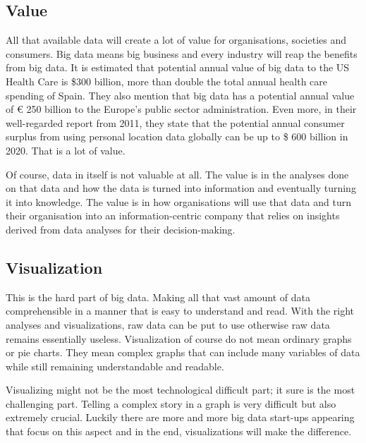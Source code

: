 \subsection{Value}
All that available data will create a lot of value for organisations, societies and consumers. Big data means big business and every industry will reap the benefits from big data. It is estimated that potential annual value of big data to the US Health Care is \$300 billion, more than double the total annual health care spending of Spain. They also mention that big data has a potential annual value of € 250 billion to the Europe’s public sector administration. Even more, in their well-regarded report from 2011, they state that the potential annual consumer surplus from using personal location data globally can be up to \$ 600 billion in 2020. That is a lot of value.
\par
Of course, data in itself is not valuable at all. The value is in the analyses done on that data and how the data is turned into information and eventually turning it into knowledge. The value is in how organisations will use that data and turn their organisation into an information-centric company that relies  on insights derived from data analyses for their decision-making.
\subsection{Visualization}
This is the hard part of big data. Making all that vast amount of data comprehensible in a manner that is easy to understand and read. With the right analyses and visualizations, raw data can be put to use otherwise raw data remains essentially useless. Visualization of course do not mean ordinary graphs or pie charts. They mean complex graphs that can include many variables of data while still remaining understandable and readable.
\par
Visualizing might not be the most technological difficult part; it sure is the most challenging part. Telling a complex story in a graph is very difficult but also extremely crucial. Luckily there are more and more big data start-ups appearing that focus on this aspect and in the end, visualizations will make the difference.

